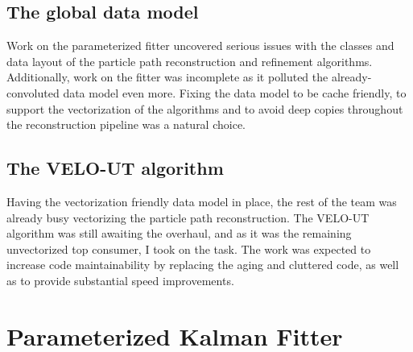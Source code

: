 \documentclass[12pt]{article}
\begin{document}
\subsection{The global data model}

Work on the parameterized fitter uncovered serious issues with the classes and data layout of the particle path reconstruction and refinement algorithms. Additionally, work on the fitter was incomplete as it polluted the already-convoluted data model even more. Fixing the data model to be cache friendly, to support the vectorization of the algorithms and to avoid deep copies throughout the reconstruction pipeline was a natural choice.


\subsection{The VELO-UT algorithm}

Having the vectorization friendly data model in place, the rest of the team was already busy vectorizing the particle path reconstruction. The VELO-UT algorithm was still awaiting the overhaul, and as it was the remaining unvectorized top consumer, I took on the task. The work was expected to increase code maintainability by replacing the aging and cluttered code, as well as to provide substantial speed improvements.


\newpage
\section{Parameterized Kalman Fitter}\label{sec_kalman_main}
\end{document}
